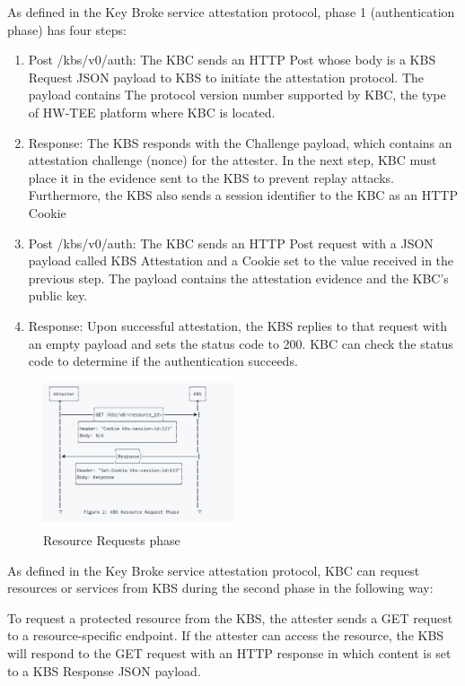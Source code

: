 As defined in the Key Broke service attestation protocol, phase 1 (authentication phase) has four steps: 
\begin{displayquote}
    \begin{enumerate}
        \item  Post /kbs/v0/auth: The KBC sends an HTTP Post whose body is a KBS Request JSON payload to KBS to initiate the attestation protocol. The payload contains The protocol version number supported by KBC, the type of HW-TEE platform where KBC is located.
        \item  Response: The KBS responds with the Challenge payload, which contains an attestation challenge (nonce) for the attester. In the next step, KBC must place it in the evidence sent to the KBS to prevent replay attacks. Furthermore, the KBS also sends a session identifier to the KBC as an HTTP Cookie
        \item  Post /kbs/v0/auth: The KBC sends an HTTP Post request with a JSON payload called KBS Attestation and a Cookie set to the value received in the previous step. The payload contains the attestation evidence and the KBC’s public key.
        \item  Response: Upon successful attestation, the KBS replies to that request with an empty payload and sets the status code to 200. KBC can check the status code to determine if the authentication succeeds. 
    \end{enumerate}
\end{displayquote}

\begin{figure}[htp]
    \centering
    \includegraphics[width=0.5\textwidth]{images/resourcerequrie.PNG}
    \caption[Resource Requests phase]{Resource Requests phase}
    \label{fig:resourcerequrie}
\end{figure}
As defined in the Key Broke service attestation protocol,  KBC can request resources or services from KBS during the second phase in the following way:
\begin{displayquote}
  To request a protected resource from the KBS, the attester sends a GET request to a resource-specific endpoint. If the attester can access the resource, the KBS will respond to the GET request with an HTTP response in which content is set to a KBS Response JSON payload.
\end{displayquote}


